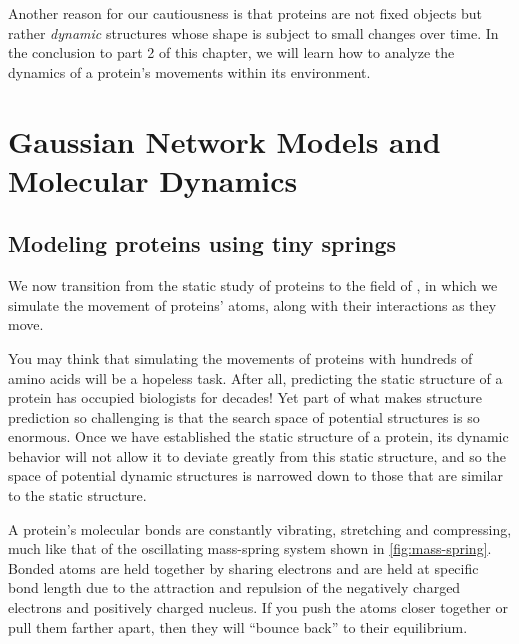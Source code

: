 Another reason for our cautiousness is that proteins are not fixed objects but rather \textit{dynamic} structures whose shape is subject to small changes over time. In the conclusion to part 2 of this chapter, we will learn how to analyze the dynamics of a protein's movements within its environment.\\

\FloatBarrier
{}

\section{Gaussian Network Models and Molecular Dynamics}
\label{sec:gaussian_network_models}
\subsection{Modeling proteins using tiny springs}

We now transition from the static study of proteins to the field of , in which we simulate the movement of proteins' atoms, along with their interactions as they move.

You may think that simulating the movements of proteins with hundreds of amino acids will be a hopeless task. After all, predicting the static structure of a protein has occupied biologists for decades! Yet part of what makes structure prediction so challenging is that the search space of potential structures is so enormous. Once we have established the static structure of a protein, its dynamic behavior will not allow it to deviate greatly from this static structure, and so the space of potential dynamic structures is narrowed down to those that are similar to the static structure.

A protein's molecular bonds are constantly vibrating, stretching and compressing, much like that of the oscillating mass-spring system shown in \autoref{fig:mass-spring}. Bonded atoms are held together by sharing electrons and are held at specific bond length due to the attraction and repulsion of the negatively charged electrons and positively charged nucleus. If you push the atoms closer together or pull them farther apart, then they will ``bounce back'' to their equilibrium.\\

